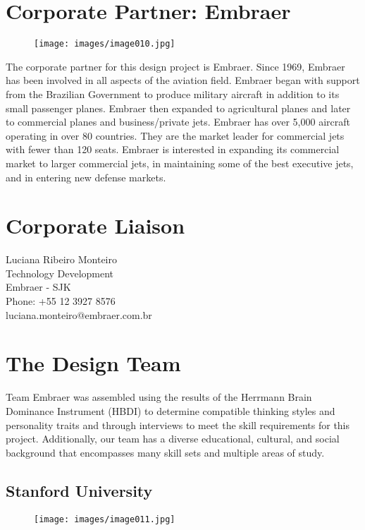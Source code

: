 \section{Corporate Partner: Embraer}

\begin{figure}[h]
  \centering
     \texttt{[image: images/image010.jpg]}
  \label{fig:10}
\end{figure}

The corporate partner for this design project is Embraer.  Since 1969, Embraer has been involved in all aspects of the aviation field.  Embraer began with support from the Brazilian Government to produce military aircraft in addition to its small passenger planes.  Embraer then expanded to agricultural planes and later to commercial planes and business/private jets.  Embraer has over 5,000 aircraft operating in over 80 countries.  They are the market leader for commercial jets with fewer than 120 seats.  Embraer is interested in expanding its commercial market to larger commercial jets, in maintaining some of the best executive jets, and in entering new defense markets.

\section*{Corporate Liaison}
Luciana Ribeiro Monteiro \\
  Technology Development \\
  Embraer - SJK \\
  Phone: +55 12 3927 8576 \\
  luciana.monteiro@embraer.com.br

\section{The Design Team}
Team Embraer was assembled using the results of the Herrmann Brain Dominance Instrument (HBDI) to determine compatible thinking styles and personality traits and through interviews to meet the skill requirements for this project.  Additionally, our team has a diverse educational, cultural, and social background that encompasses many skill sets and multiple areas of study.

\subsection*{Stanford University}

\begin{figure}[h]
  \centering
     \texttt{[image: images/image011.jpg]}
  \label{fig:11}
\end{figure}

